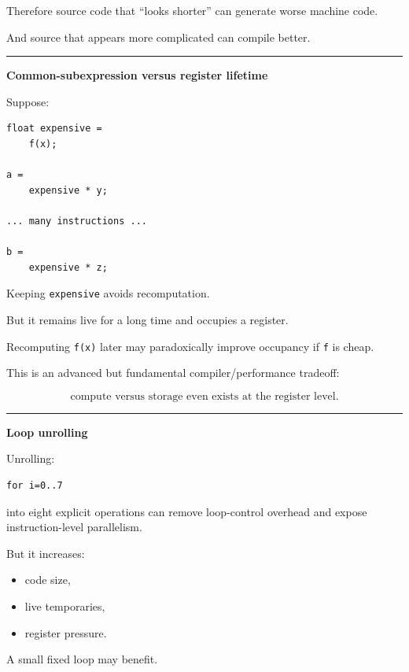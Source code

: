 Therefore source code that ``looks shorter'' can generate worse machine code.

And source that appears more complicated can compile better.

\begin{center}\rule{0.5\linewidth}{0.5pt}\end{center}

\textbf{Common-subexpression versus register lifetime}

Suppose:

\protect{}\label{p10-cse}%
\begin{verbatim}
float expensive =
    f(x);

a =
    expensive * y;

... many instructions ...

b =
    expensive * z;
\end{verbatim}

Keeping \texttt{expensive} avoids recomputation.

But it remains live for a long time and occupies a register.

Recomputing \texttt{f(x)} later may paradoxically improve occupancy if \texttt{f} is cheap.

This is an advanced but fundamental compiler/performance tradeoff:

\[
\boxed{
\text{compute versus storage even exists at the register level}.
}
\]

\begin{center}\rule{0.5\linewidth}{0.5pt}\end{center}

\textbf{Loop unrolling}

Unrolling:

\protect{}\label{p10-unroll}%
\begin{verbatim}
for i=0..7
\end{verbatim}

into eight explicit operations can remove loop-control overhead and expose instruction-level parallelism.

But it increases:

\begin{itemize}
\tightlist
\item
  code size,
\item
  live temporaries,
\item
  register pressure.
\end{itemize}

A small fixed loop may benefit.

